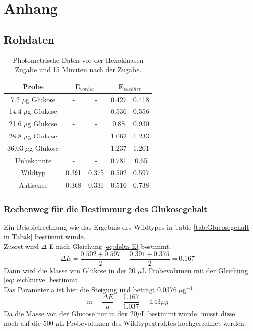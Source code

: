 \documentclass[10pt,a4paper]{article}
\begin{document}
	\section{Anhang}
		\subsection{Rohdaten}
		
		\begin{table}[H]
			\centering
			\begin{tabular}{ccccc}
				\toprule
				Probe & \multicolumn{2}{c}{E$_{vorher}$} & \multicolumn{2}{c}{E$_{nachher}$} \\
				\midrule
				7.2 $\mu$g Glukose& - & - & 0.427 & 0.418\\
				14.4 $\mu$g Glukose& - & - & 0.536 & 0.556\\
				21.6 $\mu$g Glukose& - & - &0.88 & 0.930\\
				28.8 $\mu$g Glukose&-&-&1.062 & \textcolor{Redish}{1.233}\\
				36.03 $\mu$g Glukose&-&-&1.237&\textcolor{Redish}{1.201}\\
				\midrule
				Unbekannte & - &- &0.781 & 0.65\\
				Wildtyp & 0.391 & 0.375 & 0.502 & 0.597\\
				Antisense & 0.368 & 0.331 & 0.516 & 0.738\\
				\bottomrule
			\end{tabular}
			\caption{Photometrische Daten vor der Hexokinasen Zugabe und 15 Minuten nach der Zugabe.}
			\label{tab:Extinktion}
		\end{table}
		
	
	\subsubsection{Rechenweg für die Bestimmung des Glukosegehalt}\label{rechenweg}
	Ein Beispielrechnung wie das Ergebnis des Wildtypes in Table \ref{tab:Glucosegehalt in Tabak} bestimmt wurde.\\
	Zuerst wird $\Delta$ E nach Gleichung \ref{eq:delta E} bestimmt.\\
	
	\begin{equation}\nonumber
		\Delta E = \frac{0.502 + 0.597}{2} -  \frac{0.391 + 0.375}{2} = 0.167
	\end{equation}
	Dann wird die Masse von Glukose in der 20 $\mu$L  Probevolumen mit der Gleichung \ref{eq: eichkurve} bestimmt.\\
	Das Parameter a ist hier die Steigung und beträgt 0.0376 $\mu$g$^{-1}$.\\
	\begin{equation}\nonumber
		m = \frac{\Delta E}{a} = \frac{0.167}{0.037} = 4.43 \mu g
	\end{equation}
	Da die Masse von der Glucose nur in den 20$\mu$L bestimmt wurde, musst diese noch auf die 500 $\mu$L  Probevolumen des Wildtypextraktes hochgerechnet werden.\\
	
\end{document}
